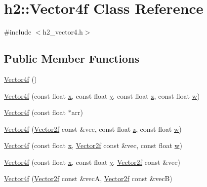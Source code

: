 \hypertarget{classh2_1_1_vector4f}{\section{h2\-:\-:Vector4f Class Reference}
\label{classh2_1_1_vector4f}
}


{\ttfamily \#include $<$h2\-\_\-vector4.\-h$>$}

\subsection*{Public Member Functions}
\begin{DoxyCompactItemize}
\item 
\hyperlink{classh2_1_1_vector4f_a311f76a4bf020eba21603c489b7d0e51}{Vector4f} ()
\item 
\hyperlink{classh2_1_1_vector4f_ae229205ccfbed94658aea1c152933429}{Vector4f} (const float \hyperlink{classh2_1_1_vector4f_adac3565214ca8c155656652eb63de199}{x}, const float \hyperlink{classh2_1_1_vector4f_a55b852da5da18182eade72cc31a24c07}{y}, const float \hyperlink{classh2_1_1_vector4f_a537a0df644f481fc056c92d484644dcd}{z}, const float \hyperlink{classh2_1_1_vector4f_aa59d06bc0affb9f4fa5c559ccd834bca}{w})
\item 
\hyperlink{classh2_1_1_vector4f_a0f8da592ffbb3d4d89fff897cbeff4af}{Vector4f} (const float $\ast$arr)
\item 
\hyperlink{classh2_1_1_vector4f_afa09ade032c8c820706a13f2d5328c59}{Vector4f} (\hyperlink{classh2_1_1_vector2f}{Vector2f} const \&vec, const float \hyperlink{classh2_1_1_vector4f_a537a0df644f481fc056c92d484644dcd}{z}, const float \hyperlink{classh2_1_1_vector4f_aa59d06bc0affb9f4fa5c559ccd834bca}{w})
\item 
\hyperlink{classh2_1_1_vector4f_affecc1c315c62e6bcc8ce60c59909ac5}{Vector4f} (const float \hyperlink{classh2_1_1_vector4f_adac3565214ca8c155656652eb63de199}{x}, \hyperlink{classh2_1_1_vector2f}{Vector2f} const \&vec, const float \hyperlink{classh2_1_1_vector4f_aa59d06bc0affb9f4fa5c559ccd834bca}{w})
\item 
\hyperlink{classh2_1_1_vector4f_aa7a299b1d3ab360ee53f09e2a5a30462}{Vector4f} (const float \hyperlink{classh2_1_1_vector4f_adac3565214ca8c155656652eb63de199}{x}, const float \hyperlink{classh2_1_1_vector4f_a55b852da5da18182eade72cc31a24c07}{y}, \hyperlink{classh2_1_1_vector2f}{Vector2f} const \&vec)
\item 
\hyperlink{classh2_1_1_vector4f_a12a695e838213708b0bee0b03931d5c1}{Vector4f} (\hyperlink{classh2_1_1_vector2f}{Vector2f} const \&vec\-A, \hyperlink{classh2_1_1_vector2f}{Vector2f} const \&vec\-B)

\end{DoxyCompactItemize}
